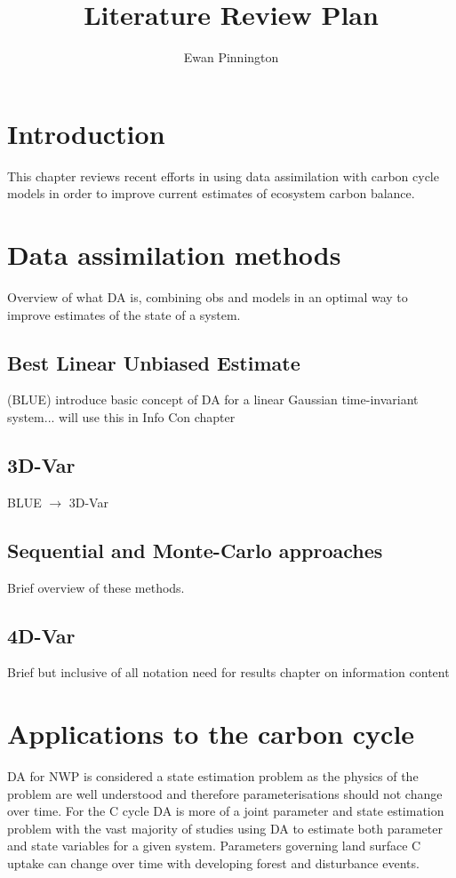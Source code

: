 \documentclass[12pt]{article}
\title{Literature Review Plan}
\author{Ewan Pinnington}
\begin{document}
\maketitle

\section{Introduction}

This chapter reviews recent efforts in using data assimilation with carbon cycle models in order to improve current estimates of ecosystem carbon balance.

\section{Data assimilation methods}
Overview of what DA is, combining obs and models in an optimal way to improve estimates of the state of a system.

\subsection{Best Linear Unbiased Estimate}

(BLUE) introduce basic concept of DA for a linear Gaussian time-invariant system... will use this in Info Con chapter

\subsection{3D-Var}

BLUE \(\rightarrow\) 3D-Var

\subsection{Sequential and Monte-Carlo approaches}

Brief overview of these methods.

\subsection{4D-Var}

Brief but inclusive of all notation need for results chapter on information content

\section{Applications to the carbon cycle}

DA for NWP is considered a state estimation problem as the physics of the problem are well understood and therefore parameterisations should not change over time. For the C cycle DA is more of a joint parameter and state estimation problem with the vast majority of studies using DA to estimate both parameter and state variables for a given system. Parameters governing land surface C uptake can change over time with developing forest and disturbance events.  
\end{document}
